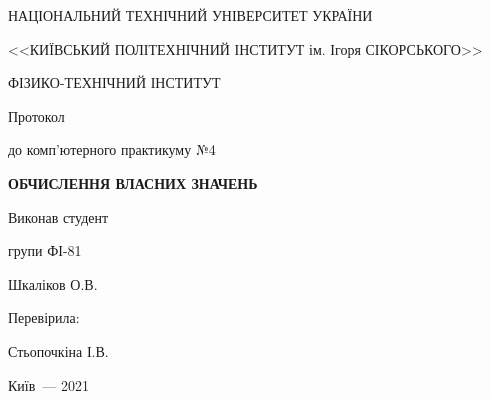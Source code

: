 \thispagestyle{empty}

\begin{center}
НАЦІОНАЛЬНИЙ ТЕХНІЧНИЙ УНІВЕРСИТЕТ УКРАЇНИ \par
<<КИЇВСЬКИЙ ПОЛІТЕХНІЧНИЙ ІНСТИТУТ ім. Ігоря СІКОРСЬКОГО>>\par
ФІЗИКО-ТЕХНІЧНИЙ ІНСТИТУТ\par

\vspace{5cm}
{\huge Протокол \par до комп’ютерного практикуму №4 \par}

\vspace{1cm}
\huge\MakeUppercase{\textbf{ ОБЧИСЛЕННЯ ВЛАСНИХ ЗНАЧЕНЬ }} \par
\end{center}

\vspace{2cm}
\begin{flushright}
Виконав студент

групи ФІ-81

\bigbreak

Шкаліков О.В.

\vspace{20mm}
Перевірила:

Стьопочкіна І.В.

\end{flushright}

\vspace{5cm}
\begin{center}
{Київ~--- 2021}
\end{center}

\newpage
